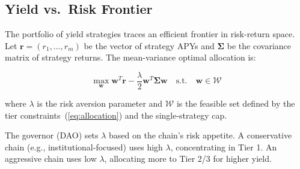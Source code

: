 \subsection{Yield vs.\ Risk Frontier}

The portfolio of yield strategies traces an efficient frontier in risk-return space. Let $\bm{r} = (r_1, \ldots, r_m)$ be the vector of strategy APYs and $\bm{\Sigma}$ be the covariance matrix of strategy returns. The mean-variance optimal allocation is:

\begin{equation}\label{eq:frontier}
  \max_{\bm{w}} \bm{w}^T \bm{r} - \frac{\lambda}{2} \bm{w}^T \bm{\Sigma} \bm{w}
  \quad \text{s.t.} \quad \bm{w} \in \mathcal{W}
\end{equation}

where $\lambda$ is the risk aversion parameter and $\mathcal{W}$ is the feasible set defined by the tier constraints~(\ref{eq:allocation}) and the single-strategy cap.

\begin{remark}
The governor (DAO) sets $\lambda$ based on the chain's risk appetite. A conservative chain (e.g., institutional-focused) uses high $\lambda$, concentrating in Tier 1. An aggressive chain uses low $\lambda$, allocating more to Tier 2/3 for higher yield.
\end{remark}

